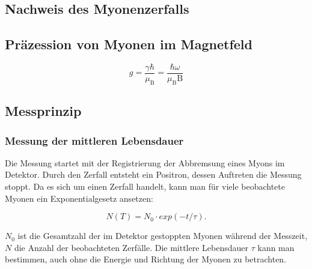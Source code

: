 \documentclass[a4paper,ngerman]{scrartcl}
\begin{document}



\subsection{Nachweis des Myonenzerfalls}
\label{sec:nachweis}


\subsection{Präzession von Myonen im Magnetfeld}
\label{sec:prazission}
\begin{equation}
g = \frac{\gamma \hbar}{\mu_\mathrm{B}} = \frac{\hbar \omega}{\mu_\mathrm{B}\mathrm{B}}
\end{equation}

\subsection{Messprinzip}
\label{sec:messprinzip}

\subsubsection*{Messung der mittleren Lebensdauer}

Die Messung startet mit der Registrierung der Abbremsung eines Myons im Detektor. Durch den Zerfall entsteht ein Positron, dessen Auftreten die Messung stoppt. Da es sich um einen Zerfall handelt, kann man für viele beobachtete Myonen ein Exponentialgesetz ansetzen:

\begin{equation}
\label{eqn:messprinzip-zerfall}
N(T) = N_0 \cdot exp(-t / \tau) .
\end{equation} 
	
$N_0$ ist die Gesamtzahl der im Detektor gestoppten Myonen während der Messzeit, $N$ die Anzahl der beobachteten Zerfälle.
Die mittlere Lebensdauer $\tau$ kann man bestimmen, auch ohne die Energie und Richtung der Myonen zu betrachten. 
\end{document}
